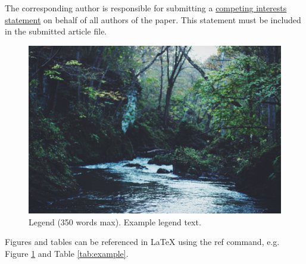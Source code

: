 \documentclass[fleqn,10pt]{wlscirep}
\begin{document}
The corresponding author is responsible for submitting a \href{http://www.nature.com/srep/policies/index.html#competing}{competing interests statement} on behalf of all authors of the paper. This statement must be included in the submitted article file.

\begin{figure}[ht]
\centering
\includegraphics[width=\linewidth]{stream}
\caption{Legend (350 words max). Example legend text.}
\label{fig:stream}
\end{figure}


Figures and tables can be referenced in LaTeX using the ref command, e.g. Figure \ref{fig:stream} and Table \ref{tab:example}.
\end{document}
